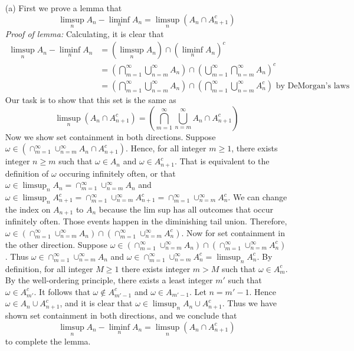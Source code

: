 \documentclass[letterpaper,10pt]{article}
\begin{document}
\begin{enumerate}
\item[(a)]
First we prove a lemma that
\[
\limsup_n A_n - \liminf_n A_n = \limsup_n (A_n \cap A_{n+1}^c)
\]
\textit{Proof of lemma:} Calculating, it is clear that
\begin{align*}
\limsup_n A_n - \liminf_n A_n &= (\limsup_n A_n) \cap (\liminf_n A_n)^c \\
&= (\bigcap_{m=1}^\infty \bigcup_{n=m}^\infty A_n) \cap (\bigcup_{m=1}^\infty \bigcap_{n=m}^\infty A_n)^c \\
&= (\bigcap_{m=1}^\infty \bigcup_{n=m}^\infty A_n) \cap (\bigcap_{m=1}^\infty \bigcup_{n=m}^\infty A_n^c) \text{ by DeMorgan's laws}
\end{align*}
Our task is to show that this set is the same as
\[
\limsup_n (A_n \cap A_{n+1}^c) =  (\bigcap_{m=1}^\infty \bigcup_{n=m}^\infty A_n \cap A_{n+1}^c)
\]
Now we show set containment in both directions. Suppose $\omega \in (\cap_{m=1}^\infty \cup_{n=m}^\infty A_n \cap A_{n+1}^c)$.
Hence, for all integer $m \geq 1$, there exists integer $n \geq m$ such that $\omega \in A_n$ and $ \omega \in A_{n+1}^c$.
That is equivalent to the definition of $\omega$ occuring infinitely often, or that $\omega \in \limsup_n A_n = \cap_{m=1}^\infty \cup_{n=m}^\infty A_n$ and $\omega \in \limsup_n A_{n+1}^c = \cap_{m=1}^\infty \cup_{n=m}^\infty A_{n+1}^c = \cap_{m=1}^\infty \cup_{n=m}^\infty A_{n}^c$. 
We can change the index on $A_{n+1}$ to $A_n$ because the lim sup has all outcomes that occur infinitely often. Those events happen in the diminishing tail union.
Therefore, $\omega \in (\cap_{m=1}^\infty \cup_{n=m}^\infty A_n) \cap (\cap_{m=1}^\infty \cup_{n=m}^\infty A_n^c)$. 
Now for set containment in the other direction. Suppose $\omega \in (\cap_{m=1}^\infty \cup_{n=m}^\infty A_n) \cap (\cap_{m=1}^\infty \cup_{n=m}^\infty A_n^c)$. 
Thus $\omega \in \cap_{m=1}^\infty \cup_{n=m}^\infty A_n$ and $\omega \in  \cap_{m=1}^\infty \cup_{n=m}^\infty A_n^c = \limsup_n A_n^c$. 
By definition, for all integer $M \geq 1$ there exists integer $m > M$ such that $\omega \in A_m^c$. 
By the well-ordering principle, there exists a least integer $m'$ such that $\omega \in A_{m'}^c$. 
It follows that $\omega \notin A_{m' - 1}^c$ and $\omega \in A_{m'-1}$. 
Let $n = m'-1$. Hence $\omega \in A_n \cup A_{n+1}^c$, and it is clear that $\omega \in \limsup_n A_n \cup A_{n+1}^c$. Thus we have shown set containment in both directions, and we conclude that
\[
\limsup_n A_n - \liminf_n A_n = \limsup_n (A_n \cap A_{n+1}^c)
\]
to complete the lemma.


\end{enumerate}
\end{document}
